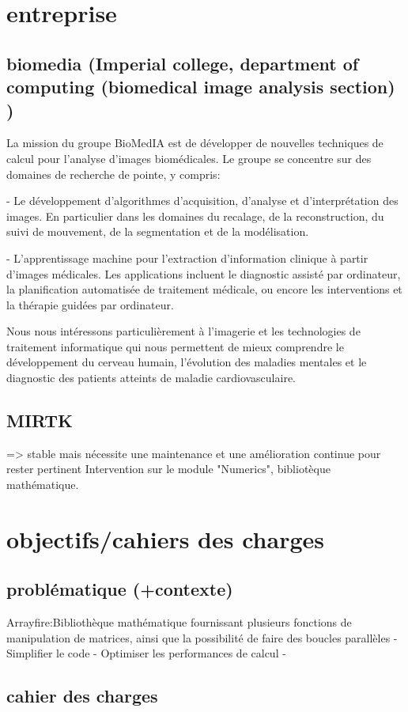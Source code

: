 \documentclass{report}
\begin{document}
\chapter{entreprise} 
	\section{biomedia (Imperial college, department of computing (biomedical image analysis section) )}

	La mission du groupe BioMedIA est de développer de nouvelles techniques de
	calcul pour l'analyse d'images biomédicales. Le groupe se concentre sur des
	domaines de recherche de pointe, y compris:

	- Le développement d'algorithmes d'acquisition, d'analyse et d'interprétation
	des images. En particulier dans les domaines du recalage, de la reconstruction,
	du suivi de mouvement, de la segmentation et de la modélisation.

	- L'apprentissage machine pour l'extraction d'information clinique à partir
	d'images médicales. Les applications incluent le diagnostic assisté par
	ordinateur, la planification automatisée de traitement médicale, ou encore les
	interventions et la thérapie guidées par ordinateur.

	Nous nous intéressons particulièrement à l'imagerie et les technologies de
	traitement informatique qui nous permettent de mieux comprendre le
	développement du cerveau humain, l’évolution des maladies mentales et le
	diagnostic des patients atteints de maladie cardiovasculaire.

	\section{MIRTK}
	 => stable mais nécessite une maintenance et une amélioration continue pour rester pertinent
	 Intervention sur le module "Numerics", bibliotèque mathématique.
\chapter{ objectifs/cahiers des charges}
	\section{problématique (+contexte)}
	Arrayfire:Bibliothèque mathématique fournissant plusieurs fonctions de manipulation de matrices, ainsi que la possibilité de faire des boucles parallèles
	- Simplifier le code - Optimiser les performances de calcul -
	\section{cahier des charges}
\end{document}
